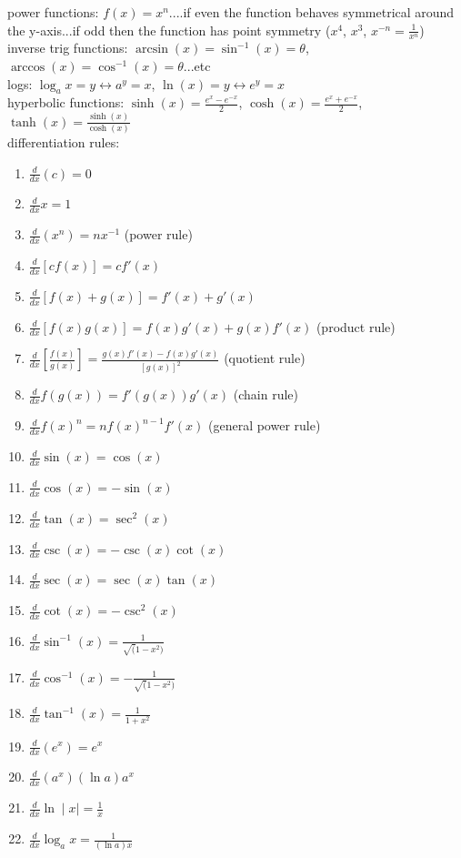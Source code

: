 \documentclass{article}
\begin{document}
power functions: $f(x) = x^n$....if even the function behaves symmetrical around the y-axis...if odd then the function has point symmetry ($x^4$, $x^3$, $x^{-n} = \frac{1}{x^n}$)\\

inverse trig functions: $\arcsin(x) = \sin^{-1}(x) = \theta$, $\arccos(x) = \cos^{-1}(x) = \theta$...etc\\

logs: $\log_ax=y \leftrightarrow a^y = x$, $\ln(x)=y \leftrightarrow e^y=x$\\

hyperbolic functions: $\sinh(x) = \frac{e^x-e^{-x}}{2}$, $\cosh(x) = \frac{e^x+e^{-x}}{2}$, $\tanh(x) = \frac{\sinh(x)}{\cosh(x)}$\\

differentiation rules:
	\begin{enumerate}
		\item$\frac{d}{dx}(c) = 0$
		\item$\frac{d}{dx}x = 1$
		\item$\frac{d}{dx}(x^n) = nx^{-1}$ (power rule)
		\item$\frac{d}{dx}[cf(x)] = cf'(x)$
		\item$\frac{d}{dx}[f(x)+g(x)] = f'(x) + g'(x)$
		\item$\frac{d}{dx}[f(x)g(x)] = f(x)g'(x) + g(x)f'(x)$ (product rule)
		\item$\frac{d}{dx}[\frac{f(x)}{g(x)}] = \frac{g(x)f'(x) - f(x)g'(x)}{[g(x)]^2}$ (quotient rule)
		\item$\frac{d}{dx}f(g(x)) = f'(g(x))g'(x)$ (chain rule)
		\item$\frac{d}{dx}f(x)^n = nf(x)^{n-1}f'(x)$ (general power rule)
		\item$\frac{d}{dx}\sin(x) = \cos(x)$ 
		\item$\frac{d}{dx}\cos(x) = -\sin(x)$
		\item$\frac{d}{dx}\tan(x) = \sec^2(x)$
		\item$\frac{d}{dx}\csc(x) = -\csc(x)\cot(x)$
		\item$\frac{d}{dx}\sec(x) = \sec(x)\tan(x)$
		\item$\frac{d}{dx}\cot(x) = -\csc^2(x)$
		\item$\frac{d}{dx}\sin^{-1}(x) = \frac{1}{\sqrt(1 - x^2)}$
		\item$\frac{d}{dx}\cos^{-1}(x) = -\frac{1}{\sqrt(1 - x^2)}$
		\item$\frac{d}{dx}\tan^{-1}(x) = \frac{1}{1 + x^2}$
		\item$\frac{d}{dx}(e^x) = e^x$
		\item$\frac{d}{dx}(a^x) (\ln a)a^x$
		\item$\frac{d}{dx}\ln\mid x\mid = \frac{1}{x}$
		\item$\frac{d}{dx}\log_ax = \frac{1}{(\ln a)x}$
	\end{enumerate}
\end{document}
